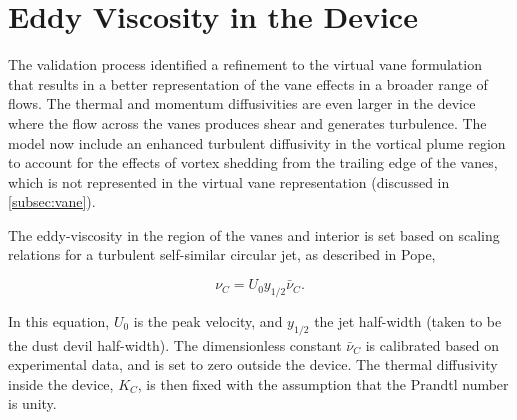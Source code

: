 \section{Eddy Viscosity in the Device}

The validation process identified a refinement to the virtual vane
formulation that results in a better representation of the vane
effects in a broader range of flows. The thermal and momentum
diffusivities are even larger in the device where the flow across the
vanes produces shear and generates turbulence. The model now include an
enhanced turbulent diffusivity in the vortical plume region to account
for the effects of vortex shedding from the trailing edge of the vanes,
which is not represented in the virtual vane representation (discussed in
\ref{subsec:vane}). 


The eddy-viscosity in the region of the vanes and interior is set based
on scaling relations for a turbulent self-similar circular jet, as
described in Pope\cite{pope2000turbulent},
 
\begin{equation}
  \nu_C = U_0 y_{1/2} \bar \nu_C.
\end{equation}

In this equation, $U_0$ is the peak velocity, and $y_{1/2}$ the jet
half-width (taken to be the dust devil half-width).  
The dimensionless constant $\bar \nu_C $ is calibrated based on
experimental data, and is set to zero outside the device. 
The thermal diffusivity inside the device, $K_C$, is then fixed with the 
assumption that the Prandtl number is unity.  

